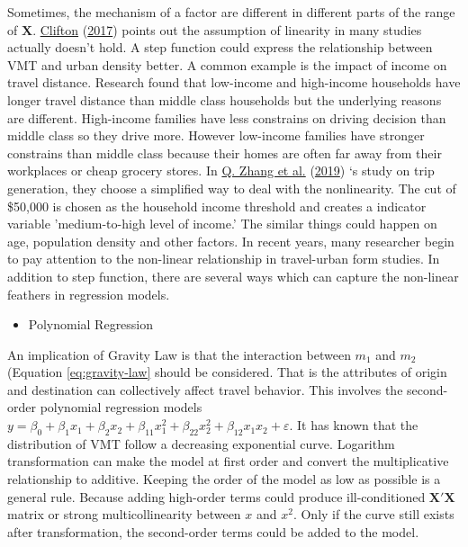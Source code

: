 \documentclass[
  11pt,
  openany]{memoir}
\providecommand{\tightlist}{%
  \setlength{\itemsep}{0pt}\setlength{\parskip}{0pt}}
\begin{document}
Sometimes, the mechanism of a factor are different in different parts of the range of \(\mathbf{X}\).
\protect\hyperlink{ref-cliftonGettingHereThere2017}{Clifton} (\protect\hyperlink{ref-cliftonGettingHereThere2017}{2017}) points out the assumption of linearity in many studies actually doesn't hold. A step function could express the relationship between VMT and urban density better.
A common example is the impact of income on travel distance. Research found that low-income and high-income households have longer travel distance than middle class households but the underlying reasons are different.
High-income families have less constrains on driving decision than middle class so they drive more.
However low-income families have stronger constrains than middle class because their homes are often far away from their workplaces or cheap grocery stores. In \protect\hyperlink{ref-zhangHouseholdTripGeneration2019}{Q. Zhang et al.} (\protect\hyperlink{ref-zhangHouseholdTripGeneration2019}{2019}) `s study on trip generation, they choose a simplified way to deal with the nonlinearity. The cut of \$50,000 is chosen as the household income threshold and creates a indicator variable 'medium-to-high level of income.'
The similar things could happen on age, population density and other factors.
In recent years, many researcher begin to pay attention to the non-linear relationship in travel-urban form studies.
In addition to step function, there are several ways which can capture the non-linear feathers in regression models.

\begin{itemize}
\tightlist
\item
  Polynomial Regression
\end{itemize}

An implication of Gravity Law is that the interaction between \(m_1\) and \(m_2\) (Equation \eqref{eq:gravity-law} should be considered. That is the attributes of origin and destination can collectively affect travel behavior.
This involves the second-order polynomial regression models \(y=\beta_0+\beta_1x_1+\beta_2x_2+\beta_{11}x_1^2+\beta_{22}x_2^2+\beta_{12}x_1x_2+\varepsilon\).
It has known that the distribution of VMT follow a decreasing exponential curve. Logarithm transformation can make the model at first order and convert the multiplicative relationship to additive.
Keeping the order of the model as low as possible is a general rule.
Because adding high-order terms could produce ill-conditioned \(\mathbf{X'X}\) matrix or strong multicollinearity between \(x\) and \(x^2\).
Only if the curve still exists after transformation, the second-order terms could be added to the model.
\end{document}
